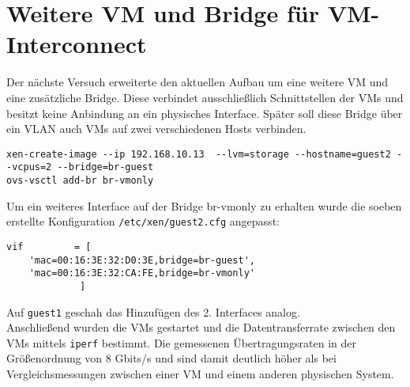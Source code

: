 \section{Weitere VM und Bridge für VM-Interconnect}
Der nächste Versuch erweiterte den aktuellen Aufbau um eine weitere VM und eine zusätzliche Bridge. Diese verbindet ausschließlich Schnittstellen der VMs und besitzt keine Anbindung an ein physisches Interface. Später soll diese Bridge über ein VLAN auch VMs auf zwei verschiedenen Hosts verbinden.
\begin{verbatim}
xen-create-image --ip 192.168.10.13  --lvm=storage --hostname=guest2 --vcpus=2 --bridge=br-guest
ovs-vsctl add-br br-vmonly
\end{verbatim}
Um ein weiteres Interface auf der Bridge br-vmonly zu erhalten wurde die soeben erstellte Konfiguration \verb#/etc/xen/guest2.cfg# angepasst:
\setupVerbatimOut
\begin{verbatim}
vif         = [
    'mac=00:16:3E:32:D0:3E,bridge=br-guest',
    'mac=00:16:3E:32:CA:FE,bridge=br-vmonly' 
             ]
\end{verbatim}
Auf \verb#guest1# geschah das Hinzufügen des 2. Interfaces analog.\\
Anschließend wurden die VMs gestartet und die Datentransferrate zwischen den VMs mittels \verb#iperf# bestimmt. Die gemessenen Übertragungsraten in der Größenordnung von 8 Gbits/s und sind damit deutlich höher als bei Vergleichsmessungen zwischen einer VM und einem anderen physischen System.

\setupVerbatimOut

